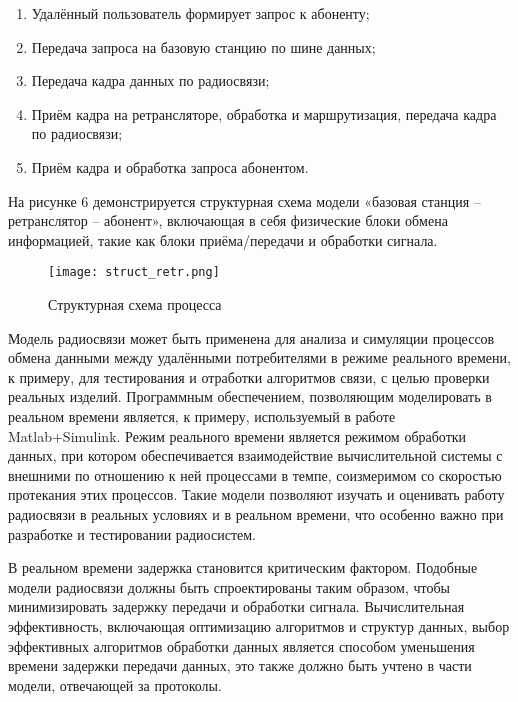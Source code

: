  
\begin{onehalfspace}

	\begin{enumerate} 
	\item Удалённый пользователь формирует запрос к абоненту;
	\item Передача запроса на базовую станцию по шине данных;
	\item Передача кадра данных по радиосвязи;
	\item Приём кадра на ретрансляторе, обработка и маршрутизация, передача кадра по радиосвязи;
	\item Приём кадра и обработка запроса абонентом.
	\end{enumerate} 

 На рисунке 6 демонстрируется структурная схема модели «базовая станция – ретранслятор – абонент», включающая в себя физические блоки обмена информацией, такие как блоки приёма/передачи и обработки сигнала.
 
 \begin{figure}[H]
			\centering
			\texttt{[image: struct\_retr.png]}
			\caption{Структурная схема процесса}
			\label{fig:model7}
	\end{figure}


 Модель радиосвязи может быть применена для анализа и симуляции процессов обмена данными между удалёнными потребителями в режиме реального времени, к примеру, для тестирования и отработки алгоритмов связи, с целью проверки реальных изделий. Программным обеспечением, позволяющим моделировать в реальном времени является, к примеру, используемый в работе Matlab+Simulink. Режим реального времени является режимом обработки данных, при котором обеспечивается взаимодействие вычислительной системы с внешними по отношению к ней процессами в темпе, соизмеримом со скоростью протекания этих процессов. Такие модели позволяют изучать и оценивать работу радиосвязи в реальных условиях и в реальном времени, что особенно важно при разработке и тестировании радиосистем.
 
В реальном времени задержка становится критическим фактором. Подобные модели радиосвязи должны быть спроектированы таким образом, чтобы минимизировать задержку передачи и обработки сигнала. Вычислительная эффективность, включающая оптимизацию алгоритмов и структур данных, выбор эффективных алгоритмов обработки данных является способом уменьшения времени задержки передачи данных, это также должно быть учтено в части модели, отвечающей за протоколы. 


\end{onehalfspace}
